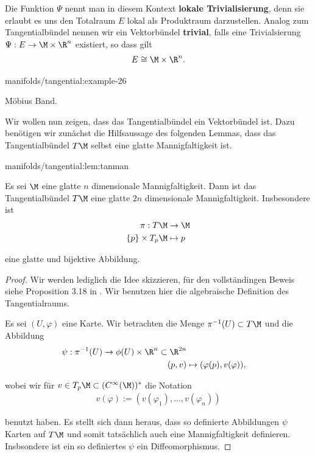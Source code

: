 \documentclass[letterpaper,10pt,german]{jupyterBook}
\begin{document}
\par
Die Funktion \(\Psi\) nennt man in diesem Kontext \textbf{lokale Trivialisierung}, denn sie erlaubt es uns den Totalraum \(E\) lokal als Produktraum darzustellen.
Analog zum Tangentialbündel nennen wir ein Vektorbündel \textbf{trivial}, falls eine Trivialsierung \(\Psi:E\to \M\times\R^n\) existiert, so dass gilt
\begin{align*}
E \cong \M\times\R^n.
\end{align*}\begin{example}{}{manifolds/tangential:example-26}



\par
Möbius Band.
\end{example}

\par
Wir wollen nun zeigen, dass das Tangentialbündel ein Vektorbündel ist.
Dazu benötigen wir zunächst die Hilfsaussage des folgenden Lemmas, dass das Tangentialbündel \(T\M\) selbst eine glatte Mannigfaltigkeit ist.
\begin{lemma}{}{manifolds/tangential:lem:tanman}



\par
Es sei \(\M\) eine glatte \(n\) dimensionale Mannigfaltigkeit.
Dann ist das Tangentialbündel \(T\M\) eine glatte \(2n\) dimensionale Mannigfaltigkeit.
Insbesondere ist
\begin{align*}
\pi:T\M &\to \M\\
\{p\}\times T_p\M &\mapsto p
\end{align*}
\par
eine glatte und bijektive Abbildung.
\end{lemma}

\begin{proof}
 Wir werden lediglich die Idee skizzieren, für den vollständingen Beweis siehe Proposition 3.18 in \cite{Lee03}.
Wir benutzen hier die algebraische Definition des Tangentialraums.

\par
Es sei \((U,\varphi)\) eine Karte.
Wir betrachten die Menge \(\pi^{-1}(U)\subset T\M\) und die Abbildung
\begin{align*}
\psi:\pi^{-1}(U) \to \phi(U)\times \R^{n}\subset\R^{2n}\\
(p,v) &\mapsto (\varphi(p), v(\varphi)),
\end{align*}
\par
wobei wir für \(v\in T_p\M\subset (C^\infty(\M))^\ast\) die Notation
\begin{align*}
v(\varphi) := (v(\varphi_1),\ldots, v(\varphi_n))
\end{align*}
\par
benutzt haben.
Es stellt sich dann heraus, dass so definierte Abbildungen \(\psi\) Karten auf \(T\M\) und somit tatsächlich auch eine Mannigfaltigkeit definieren.
Insbsondere ist ein so definiertes \(\psi\) ein Diffeomorphismus.
\end{proof}
\end{document}
